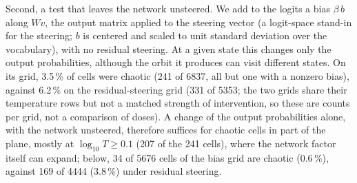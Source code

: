 \documentclass[11pt,letterpaper]{article}
\begin{document}
Second, a test that leaves the network unsteered. We add to the logits a bias $\beta\,b$ along $Wv$, the output
matrix applied to the steering vector (a logit-space stand-in for the steering; $b$ is centered and scaled to unit
standard deviation over the vocabulary), with no residual steering. At a given state this changes only the output
probabilities, although the orbit it produces can visit different states. On its grid, 3.5\,\% of cells were chaotic
(241 of 6837, all but one with a nonzero bias), against 6.2\,\% on the residual-steering grid (331 of 5353; the two grids share their temperature rows
but not a matched strength of intervention, so these are counts per grid, not a comparison of doses). A
change of the output probabilities alone, with the network unsteered, therefore suffices for chaotic cells in part
of the plane, mostly at $\log_{10}T\ge0.1$ (207 of the 241 cells), where the network factor itself can expand;
below, 34 of 5676 cells of the bias grid are chaotic (0.6\,\%), against 169 of 4444 (3.8\,\%) under residual
steering.
\end{document}
